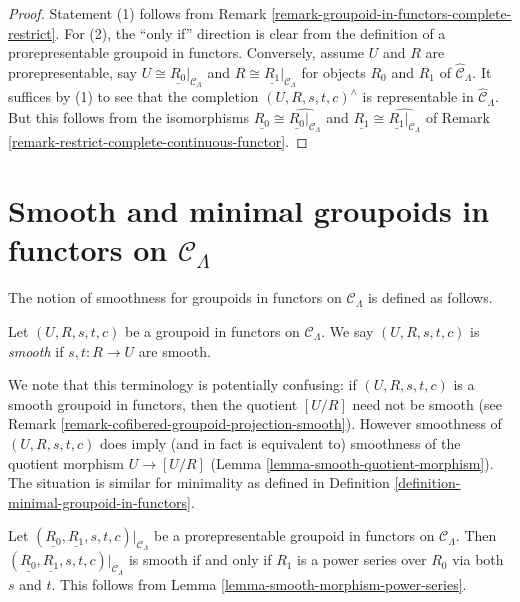 \begin{proof}
Statement (1) follows from Remark 
\ref{remark-groupoid-in-functors-complete-restrict}. For (2), the ``only if'' 
direction is clear from the definition of a prorepresentable groupoid in 
functors. Conversely, assume $U$ and $R$ are prorepresentable, say $U \cong 
\underline{R_0}|_{\mathcal{C}_\Lambda}$ and $R \cong 
\underline{R_1}|_{\mathcal{C}_\Lambda}$ for objects $R_0$ and $R_1$ of 
$\widehat{\mathcal{C}}_\Lambda$. It suffices by (1) to see that the completion 
$(U,R,s,t,c)^{\wedge}$ is representable in $\widehat{\mathcal{C}}_\Lambda$.  
But this follows from the isomorphisms $\underline{R_0} \cong 
\widehat{\underline{R_0}|_{\mathcal{C}_\Lambda}}$ and $\underline{R_1} \cong 
\widehat{\underline{R_1}|_{\mathcal{C}_\Lambda}}$ of Remark 
\ref{remark-restrict-complete-continuous-functor}.
\end{proof}






\section{Smooth and minimal groupoids in functors on $\mathcal{C}_\Lambda$}
\label{section-smooth-minimal-groupoids-in-functors}

\noindent
The notion of smoothness for groupoids in functors on $\mathcal{C}_\Lambda$ is 
defined as follows.

\begin{definition}
\label{definition-smooth-groupoid-in-functors}
Let $(U, R, s,t,c)$ be a groupoid in functors on $\mathcal{C}_\Lambda$.  We 
say $(U, R, s,t,c)$ is {\it smooth} if $s,t: R \to U$ are smooth.
\end{definition}

\begin{remark}
\label{remark-smooth-groupoid-in-functors-warning}
We note that this terminology is potentially confusing: if $(U, R, s,t,c)$ is a 
smooth groupoid in functors, then the quotient $[U/R]$ need not be smooth (see 
Remark \ref{remark-cofibered-groupoid-projection-smooth}).  However smoothness 
of $(U, R, s,t,c)$ does imply (and in fact is equivalent to) smoothness of the 
quotient morphism $U \to [U/R]$ (Lemma 
\ref{lemma-smooth-quotient-morphism}).  The situation is similar for minimality 
as defined in Definition \ref{definition-minimal-groupoid-in-functors}.
\end{remark}

\begin{remark}
\label{remark-smooth-power-series-prorepresentable-smooth-groupoid-in-functors}
Let $(\underline{R_0}, \underline{R_1}, s,t,c)|_{\mathcal{C}_\Lambda}$ be a 
prorepresentable groupoid in functors on $\mathcal{C}_\Lambda$.  Then 
$(\underline{R_0}, \underline{R_1}, s,t,c)|_{\mathcal{C}_\Lambda}$ is smooth 
if and only if $R_1$ is a power series over $R_0$ via both $s$ and $t$.  This 
follows from
Lemma \ref{lemma-smooth-morphism-power-series}.
\end{remark}

